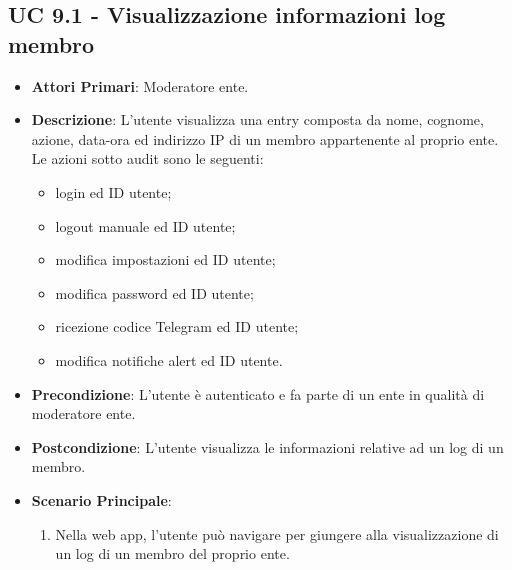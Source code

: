 		\subsection{UC 9.1 - Visualizzazione informazioni log membro}
			\begin{itemize}
			\item \textbf{Attori Primari}: Moderatore ente.
			\item \textbf{Descrizione}: L'utente visualizza una entry composta da nome, cognome, azione, data-ora ed indirizzo IP di un membro appartenente al proprio ente. Le azioni sotto audit sono le seguenti: 
			
			\begin{itemize}
				\item login ed ID utente;
				\item logout manuale ed ID utente;
				\item modifica impostazioni ed ID utente;
				\item modifica password ed ID utente;
				\item ricezione codice Telegram ed ID utente;
				\item modifica notifiche alert ed ID utente.
			\end{itemize}
			
			\item \textbf{Precondizione}: L'utente è autenticato e fa parte di un ente in qualità di moderatore ente.
			\item \textbf{Postcondizione}: L'utente visualizza le informazioni relative ad un log di un membro.
			\item \textbf{Scenario Principale}:
			\begin{enumerate}
				\item Nella web app, l'utente può navigare per giungere alla visualizzazione di un log di un membro del proprio ente.
			\end{enumerate}	
		\end{itemize}

		



		



		


